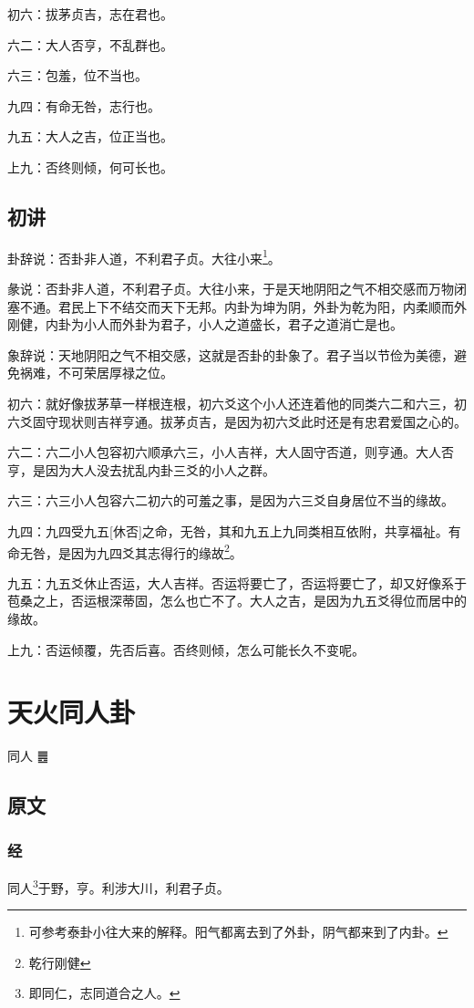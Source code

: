 \documentclass[12pt,oneside]{book}
\begin{document}
初六：拔茅贞吉，志在君也。

六二：大人否亨，不乱群也。

六三：包羞，位不当也。

九四：有命无咎，志行也。

九五：大人之吉，位正当也。

上九：否终则倾，何可长也。


\section{初讲}
卦辞说：否卦非人道，不利君子贞。大往小来\footnote{可参考泰卦小往大来的解释。阳气都离去到了外卦，阴气都来到了内卦。}。

彖说：否卦非人道，不利君子贞。大往小来，于是天地阴阳之气不相交感而万物闭塞不通。君民上下不结交而天下无邦。内卦为坤为阴，外卦为乾为阳，内柔顺而外刚健，内卦为小人而外卦为君子，小人之道盛长，君子之道消亡是也。

象辞说：天地阴阳之气不相交感，这就是否卦的卦象了。君子当以节俭为美德，避免祸难，不可荣居厚禄之位。

初六：就好像拔茅草一样根连根，初六爻这个小人还连着他的同类六二和六三，初六爻固守现状则吉祥亨通。拔茅贞吉，是因为初六爻此时还是有忠君爱国之心的。

六二：六二小人包容初六顺承六三，小人吉祥，大人固守否道，则亨通。大人否亨，是因为大人没去扰乱内卦三爻的小人之群。

六三：六三小人包容六二初六的可羞之事，是因为六三爻自身居位不当的缘故。

九四：九四受九五[休否]之命，无咎，其和九五上九同类相互依附，共享福祉。有命无咎，是因为九四爻其志得行的缘故\footnote{乾行刚健}。

九五：九五爻休止否运，大人吉祥。否运将要亡了，否运将要亡了，却又好像系于苞桑之上，否运根深蒂固，怎么也亡不了。大人之吉，是因为九五爻得位而居中的缘故。

上九：否运倾覆，先否后喜。否终则倾，怎么可能长久不变呢。


\chapter{天火同人卦}
同人 {\Large ䷌}

\section{原文}

\subsection{经}
同人\footnote{即同仁，志同道合之人。}于野，亨。利涉大川，利君子贞。
\end{document}

